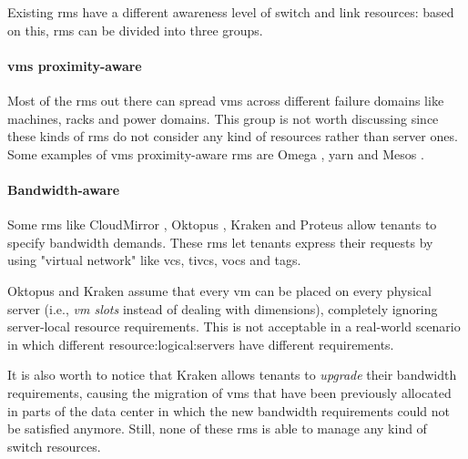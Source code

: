 Existing \glspl{rm} have a different awareness level of switch and link resources: based on this, \glspl{rm} can be divided into three groups.

\paragraph{\glspl{vm} proximity-aware}
Most of the \glspl{rm} out there can spread \glspl{vm} across different failure domains like machines, racks and power domains.
This group is not worth discussing since these kinds of \glspl{rm} do not consider any kind of resources rather than server ones.
Some examples of \glspl{vm} proximity-aware \glspl{rm} are Omega \cite{omega}, \glsdesc{yarn} and Mesos \cite{mesos}.

\paragraph{Bandwidth-aware}
   
Some \glspl{rm} like CloudMirror \cite{cloudmirror}, Oktopus \cite{oktopus}, Kraken \cite{kraken} and Proteus \cite{proteus} allow tenants to specify bandwidth demands.
These \glspl{rm} let tenants express their requests by using "virtual network"  like \glspl{vc}, \glspl{tivc}, \glspl{voc} and \glspl{tag}.

Oktopus \cite{oktopus} and Kraken \cite{kraken} assume that every \gls{vm} can be placed on every physical server (i.e., \textit{\gls{vm} slots} instead of dealing with  dimensions), completely ignoring server-local resource requirements.
This is not acceptable in a real-world scenario in which different \glspl{resource:logical:server} have different  requirements.

It is also worth to notice that Kraken \cite{kraken} allows tenants to \textit{upgrade} their bandwidth requirements, causing the migration of \glspl{vm} that have been previously allocated in parts of the data center in which the new bandwidth requirements could not be satisfied anymore.
Still, none of these \glspl{rm} is able to manage any kind of switch resources.

